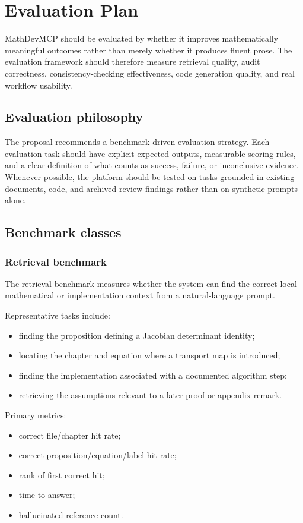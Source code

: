 \chapter{Evaluation Plan}

MathDevMCP should be evaluated by whether it improves mathematically meaningful outcomes rather than merely whether it produces fluent prose. The evaluation framework should therefore measure retrieval quality, audit correctness, consistency-checking effectiveness, code generation quality, and real workflow usability.

\section{Evaluation philosophy}

The proposal recommends a benchmark-driven evaluation strategy. Each evaluation task should have explicit expected outputs, measurable scoring rules, and a clear definition of what counts as success, failure, or inconclusive evidence. Whenever possible, the platform should be tested on tasks grounded in existing documents, code, and archived review findings rather than on synthetic prompts alone.

\section{Benchmark classes}

\subsection{Retrieval benchmark}
The retrieval benchmark measures whether the system can find the correct local mathematical or implementation context from a natural-language prompt.

Representative tasks include:
\begin{itemize}
  \item finding the proposition defining a Jacobian determinant identity;
  \item locating the chapter and equation where a transport map is introduced;
  \item finding the implementation associated with a documented algorithm step;
  \item retrieving the assumptions relevant to a later proof or appendix remark.
\end{itemize}

Primary metrics:
\begin{itemize}
  \item correct file/chapter hit rate;
  \item correct proposition/equation/label hit rate;
  \item rank of first correct hit;
  \item time to answer;
  \item hallucinated reference count.
\end{itemize}

